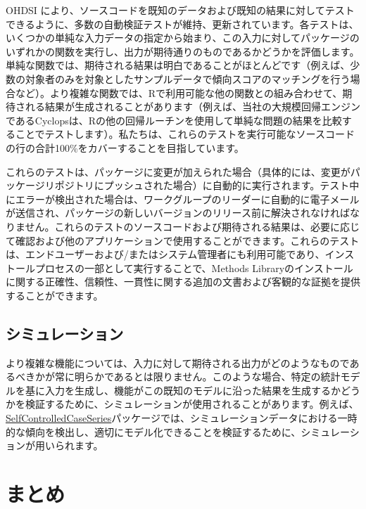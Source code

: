 \documentclass[
  11pt]{book}
\theoremstyle{definition}
\theoremstyle{definition}
\theoremstyle{definition}
\theoremstyle{definition}
\theoremstyle{remark}
\begin{document}
OHDSI により、ソースコードを既知のデータおよび既知の結果に対してテストできるように、多数の自動検証テストが維持、更新されています。各テストは、いくつかの単純な入力データの指定から始まり、この入力に対してパッケージのいずれかの関数を実行し、出力が期待通りのものであるかどうかを評価します。単純な関数では、期待される結果は明白であることがほとんどです（例えば、少数の対象者のみを対象としたサンプルデータで傾向スコアのマッチングを行う場合など）。より複雑な関数では、Rで利用可能な他の関数との組み合わせて、期待される結果が生成されることがあります（例えば、当社の大規模回帰エンジンであるCyclopsは、Rの他の回帰ルーチンを使用して単純な問題の結果を比較することでテストします）。私たちは、これらのテストを実行可能なソースコードの行の合計100\%をカバーすることを目指しています。

これらのテストは、パッケージに変更が加えられた場合（具体的には、変更がパッケージリポジトリにプッシュされた場合）に自動的に実行されます。テスト中にエラーが検出された場合は、ワークグループのリーダーに自動的に電子メールが送信され、パッケージの新しいバージョンのリリース前に解決されなければなりません。これらのテストのソースコードおよび期待される結果は、必要に応じて確認および他のアプリケーションで使用することができます。これらのテストは、エンドユーザーおよび/またはシステム管理者にも利用可能であり、インストールプロセスの一部として実行することで、Methods Libraryのインストールに関する正確性、信頼性、一貫性に関する追加の文書および客観的な証拠を提供することができます。

\subsection{シミュレーション}\label{ux30b7ux30dfux30e5ux30ecux30fcux30b7ux30e7ux30f3}

より複雑な機能については、入力に対して期待される出力がどのようなものであるべきかが常に明らかであるとは限りません。このような場合、特定の統計モデルを基に入力を生成し、機能がこの既知のモデルに沿った結果を生成するかどうかを検証するために、シミュレーションが使用されることがあります。例えば、\href{https://ohdsi.github.io/SelfControlledCaseSeries/}{SelfControlledCaseSeries}パッケージでは、シミュレーションデータにおける一時的な傾向を検出し、適切にモデル化できることを検証するために、シミュレーションが用いられます。

\section{まとめ}\label{ux307eux3068ux3081-14}
\end{document}
